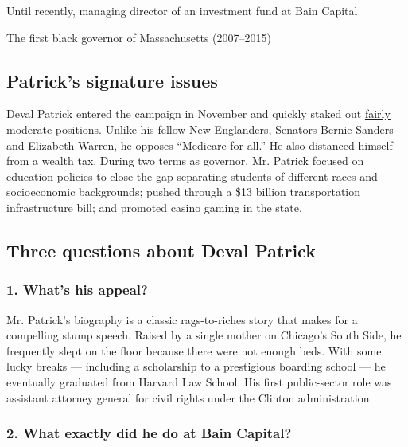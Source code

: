 Until recently, managing director of an investment fund at Bain Capital

The first black governor of Massachusetts (2007--2015)

\hypertarget{patricks-signature-issues}{%
\subsection{Patrick's signature
issues}\label{patricks-signature-issues}}

Deval Patrick entered the campaign in November and quickly staked out
\href{https://www.nytimes.com/2019/11/13/us/politics/deval-patrick-bio.html}{fairly
moderate positions}. Unlike his fellow New Englanders, Senators
\href{https://www.nytimes.com/interactive/2020/us/elections/bernie-sanders.html}{Bernie
Sanders} and
\href{https://www.nytimes.com/interactive/2020/us/elections/elizabeth-warren.html}{Elizabeth
Warren}, he opposes ``Medicare for all.'' He also distanced himself from
a wealth tax. During two terms as governor, Mr. Patrick focused on
education policies to close the gap separating students of different
races and socioeconomic backgrounds; pushed through a \$13 billion
transportation infrastructure bill; and promoted casino gaming in the
state.

\hypertarget{three-questions-about-deval-patrick}{%
\subsection{Three questions about Deval
Patrick}\label{three-questions-about-deval-patrick}}

\hypertarget{1-whats-his-appeal}{%
\subsubsection{\texorpdfstring{\textbf{1. What's his
appeal?}}{1. What's his appeal?}}\label{1-whats-his-appeal}}

Mr. Patrick's biography is a classic rags-to-riches story that makes for
a compelling stump speech. Raised by a single mother on Chicago's South
Side, he frequently slept on the floor because there were not enough
beds. With some lucky breaks --- including a scholarship to a
prestigious boarding school --- he eventually graduated from Harvard Law
School. His first public-sector role was assistant attorney general for
civil rights under the Clinton administration.

\hypertarget{2-what-exactly-did-he-do-at-bain-capital}{%
\subsubsection{\texorpdfstring{\textbf{2. What exactly did he do at Bain
Capital?}}{2. What exactly did he do at Bain Capital?}}\label{2-what-exactly-did-he-do-at-bain-capital}}

